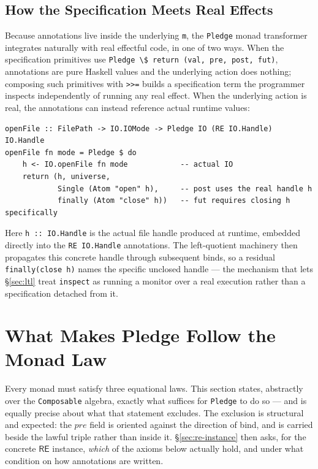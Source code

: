 \documentclass[acmsmall,screen]{acmart}
\newcommand{\RE}{\mathsf{RE}}
\newcommand{\pre}{\mathit{pre}}
\begin{document}
\subsection{How the Specification Meets Real Effects}
\label{sec:effects}

Because annotations live inside the underlying \lstinline{m}, the
\lstinline{Pledge} monad transformer integrates naturally with real
effectful code, in one of two ways.
When the specification primitives use
\lstinline{Pledge \$ return (val, pre, post, fut)}, annotations are pure
Haskell values and the underlying action does nothing; composing such
primitives with \lstinline{>>=} builds a specification term the programmer
inspects independently of running any real effect.
When the underlying action is real, the annotations can instead reference
actual runtime values:
\begin{lstlisting}
openFile :: FilePath -> IO.IOMode -> Pledge IO (RE IO.Handle) IO.Handle
openFile fn mode = Pledge $ do
    h <- IO.openFile fn mode            -- actual IO
    return (h, universe,
            Single (Atom "open" h),     -- post uses the real handle h
            finally (Atom "close" h))   -- fut requires closing h specifically
\end{lstlisting}
Here \lstinline{h :: IO.Handle} is the actual file handle produced at
runtime, embedded directly into the \lstinline{RE IO.Handle} annotations.
The left-quotient machinery then propagates this concrete handle through
subsequent binds, so a residual \lstinline{finally(close h)} names the
specific unclosed handle --- the mechanism that lets \S\ref{sec:ltl} treat
\lstinline{inspect} as running a monitor over a real execution rather than
a specification detached from it.

\section{What Makes Pledge Follow the Monad Law}
\label{sec:monad-laws}

Every monad must satisfy three equational laws.
This section states, abstractly over the \lstinline{Composable} algebra,
exactly what suffices for \lstinline{Pledge} to do so --- and is equally
precise about what that statement excludes.
The exclusion is structural and expected: the $\pre$ field is oriented
against the direction of bind, and is carried beside the lawful triple
rather than inside it.
\S\ref{sec:re-instance} then asks, for the concrete $\RE$ instance,
\emph{which} of the axioms below actually hold, and under what condition on
how annotations are written.
\end{document}
